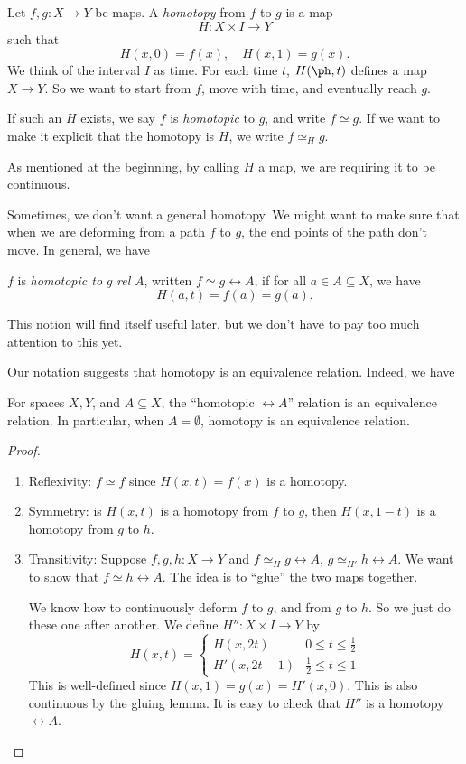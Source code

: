 \documentclass[a4paper]{article}
\begin{document}
\begin{defi}[Homotopy]
  Let $f, g: X\to Y$ be maps. A \emph{homotopy} from $f$ to $g$ is a map
  \[
    H: X\times I \to Y
  \]
  such that
  \[
    H(x, 0) = f(x),\quad H(x, 1) = g(x).
  \]
  We think of the interval $I$ as time. For each time $t$, $H(\ph, t)$ defines a map $X\to Y$. So we want to start from $f$, move with time, and eventually reach $g$.

  If such an $H$ exists, we say $f$ is \emph{homotopic} to $g$, and write $f\simeq g$. If we want to make it explicit that the homotopy is $H$, we write $f \simeq_H g$.
\end{defi}
As mentioned at the beginning, by calling $H$ a map, we are requiring it to be continuous.

Sometimes, we don't want a general homotopy. We might want to make sure that when we are deforming from a path $f$ to $g$, the end points of the path don't move. In general, we have
\begin{defi}
  $f$ is \emph{homotopic to} $g$ \emph{rel} $A$, written $f\simeq g\rel A$, if for all $a \in A\subseteq X$, we have
  \[
    H(a, t) = f(a) = g(a).
  \]
\end{defi}
This notion will find itself useful later, but we don't have to pay too much attention to this yet.

Our notation suggests that homotopy is an equivalence relation. Indeed, we have
\begin{prop}
  For spaces $X, Y$, and $A\subseteq X$, the ``homotopic $\rel A$'' relation is an equivalence relation. In particular, when $A = \emptyset$, homotopy is an equivalence relation.
\end{prop}

\begin{proof}\leavevmode
  \begin{enumerate}
    \item Reflexivity: $f \simeq f$ since $H(x, t) = f(x)$ is a homotopy.
    \item Symmetry: is $H(x, t)$ is a homotopy from $f$ to $g$, then $H(x, 1 - t)$ is a homotopy from $g$ to $h$.
    \item Transitivity: Suppose $f, g, h: X\to Y$ and $f\simeq_H g\rel A$, $g\simeq_{H'} h \rel A$. We want to show that $f\simeq h \rel A$. The idea is to ``glue'' the two maps together.

      We know how to continuously deform $f$ to $g$, and from $g$ to $h$. So we just do these one after another.
      We define $H'': X\times I \to Y$ by
      \[
        H(x, t) =
        \begin{cases}
          H(x, 2t) & 0 \leq t \leq \frac{1}{2}\\
          H'(x, 2t - 1) & \frac{1}{2} \leq t \leq 1
        \end{cases}
      \]
      This is well-defined since $H(x, 1) = g(x) = H'(x, 0)$. This is also continuous by the gluing lemma. It is easy to check that $H''$ is a homotopy $\rel A$.
  \end{enumerate}
\end{proof}
\end{document}
